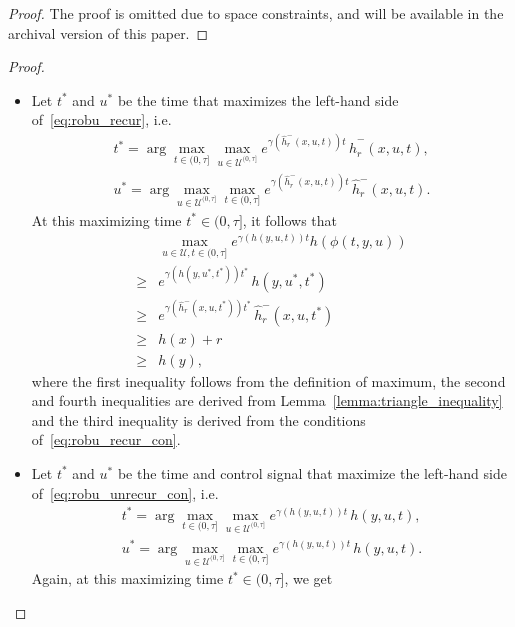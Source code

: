 \documentclass[letterpaper, 10 pt, conference]{ieeeconf}
\begin{document}
{
\begin{proof}
The proof is omitted due to space constraints, and will be available in the archival version of this paper.
\end{proof}
}{
\begin{proof}
\begin{itemize}
    \item [(i)]Let $t^{*}$ and $u^{*}$ be the time that maximizes the left-hand side of~\eqref{eq:robu_recur}, i.e. 
\begin{align*}
  t^{*}
  =
  \arg\max_{t\in(0,\tau]} \max\limits_{u \in \mathcal{U}^{(0,\tau]}} e^{\gamma(\hat h_r^-(x,u,t)) t}\, \hat{h}_{r}^{-}(x, u, t),\\
    u^{*}
  =
  \arg\max_{u\in \mathcal{U}^{(0,\tau]}} \max\limits_{t \in (0,\tau]} e^{\gamma(\hat h_r^-(x,u,t)) t}\, \hat{h}_{r}^{-}(x, u, t).
\end{align*}
At this maximizing time $t^{*} \in (0,\tau]$, it follows that
\begin{align*}
         & \max\limits_{u \in \mathcal{U}, t \in (0,\tau]} 
        e^{\gamma(h(y, u, t)) t} h(\phi(t, y, u))\\
        \geq&e^{\gamma(h(y,u^{*},t^{*})) t^{*}}\, h(y, u^{*}, t^{*})
  \\\geq &
  e^{\gamma(\hat h_r^-(x,u,t^{*})) t^{*}}\, \hat h_{r}^{-}(x, u, t^{*})
  \\
  \geq &
  h(x)+r
  \\
  \geq &
  h(y),
\end{align*}
where the first inequality follows from the definition of maximum, the second and fourth inequalities are derived from Lemma~\ref{lemma:triangle_inequality} and the third inequality is derived from the conditions of~\eqref{eq:robu_recur_con}.
    \item [(ii)] Let $t^{*}$ and $u^{*}$ be the time and control signal that maximize the left-hand side of~\eqref{eq:robu_unrecur_con}, i.e. 
\begin{align*}
  t^{*} = \arg\max_{t\in(0,\tau]}\max_{u \in \mathcal{U}^{(0,\tau]}} e^{\gamma(h(y,u,t)) t}\,h(y, u, t),\\
  u^{*} = \arg\max_{u\in\mathcal{U}^{(0,\tau]}}\max_{t \in (0,\tau]}e^{\gamma(h(y,u,t)) t}\,h(y, u, t).
\end{align*}
Again, at this maximizing time $t^{*} \in (0,\tau]$, we get


\end{itemize}
\end{proof}}
\end{document}
